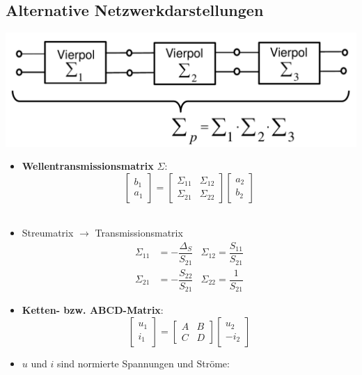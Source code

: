 {\subsection{Alternative Netzwerkdarstellungen}
\includegraphics[width=0.35\paperheight]{content/fuw/pictures/fuw_transmissionsmatrix.png}
\begin{itemize}
    \itemsep0pt
    \item \textbf{Wellentransmissionsmatrix} $\Sigma$:\\
        \[\begin{bmatrix}b_1\\ a_1\end{bmatrix} = \begin{bmatrix}\Sigma_{11} & \Sigma_{12}\\ \Sigma_{21} & \Sigma_{22}\end{bmatrix} \begin{bmatrix}a_2\\ b_2\end{bmatrix}\]\\
    \item Streumatrix $\to$ Transmissionsmatrix
        \begin{align*}
            \Sigma_{11} &= -\dfrac{\Delta_S}{S_{21}} &\Sigma_{12} = \dfrac{S_{11}}{S_{21}}\\
            \Sigma_{21} &= -\dfrac{S_{22}}{S_{21}} &\Sigma_{22} = \dfrac{1}{S_{21}}
        \end{align*}
    \item \textbf{Ketten- bzw. ABCD-Matrix}:
        \[\begin{bmatrix}u_1\\ i_1\end{bmatrix} = \begin{bmatrix}A & B\\ C & D\end{bmatrix} \begin{bmatrix}u_2\\ -i_2\end{bmatrix}\]
        \item  $u$ und $i$ sind normierte Spannungen und Ströme:\\

\end{itemize}}
